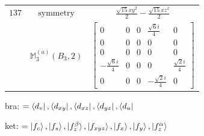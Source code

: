 \documentclass[fleqn,8pt,landscape]{jsarticle}
\begin{document}
\begin{longtable}{ccc}
$ 137 $ & $ \text{symmetry} $ & $ \frac{\sqrt{15} x y^{2}}{2} - \frac{\sqrt{15} x z^{2}}{2} $ \\
$  $ & $ \mathbb{M}_{3}^{(a)}(B_{3},2) $ & $ \begin{bmatrix} 0 & 0 & 0 & \frac{\sqrt{6} i}{4} & 0 \\ 0 & 0 & 0 & 0 & 0 \\ 0 & 0 & 0 & 0 & 0 \\ - \frac{\sqrt{6} i}{4} & 0 & 0 & 0 & \frac{\sqrt{2} i}{4} \\ 0 & 0 & 0 & - \frac{\sqrt{2} i}{4} & 0 \end{bmatrix} $ \\ \hline
\end{longtable}
bra: $=\bra{d_{v}}, \bra{d_{xy}}, \bra{d_{xz}}, \bra{d_{yz}}, \bra{d_{u}}$

\noindent
ket: $=\ket{f_{c}}, \ket{f_{s}}, \ket{f_{z}^{\beta}}, \ket{f_{xyz}}, \ket{f_{x}}, \ket{f_{y}}, \ket{f_{z}^{\alpha}}$
\renewcommand{\arraystretch}{1.6}
\end{document}
